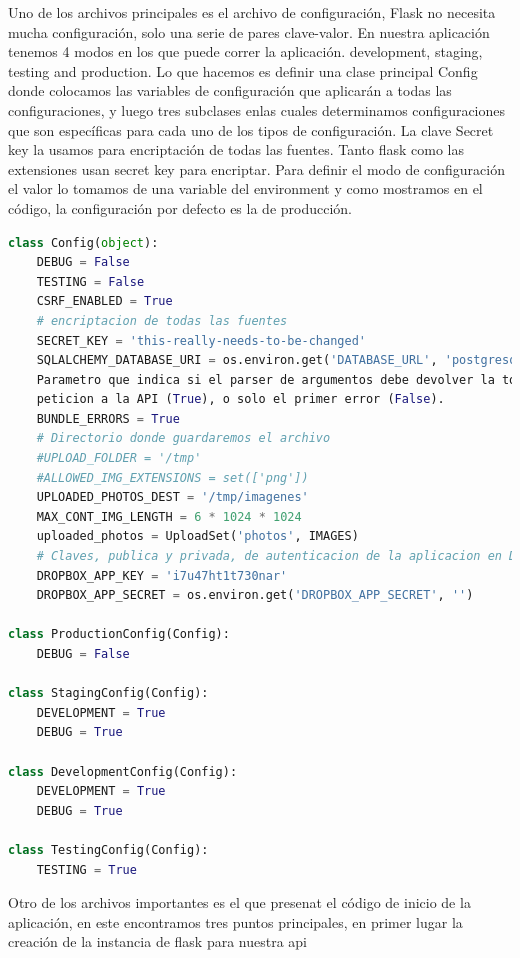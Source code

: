 \documentclass[a4paper,12pt]{article}
\begin{document}
\begin{itemize}
Uno de los archivos principales es el archivo de configuración, Flask no necesita mucha configuración, solo una serie de pares clave-valor. En nuestra aplicación tenemos 4 modos en los que puede correr la aplicación. development, staging, testing and production.
	Lo que hacemos es definir una clase principal Config donde colocamos las variables de configuración que aplicarán a todas las configuraciones, y luego tres subclases enlas cuales determinamos configuraciones que son específicas para cada uno de los tipos de configuración. La clave Secret key la usamos para encriptación de todas las fuentes. Tanto flask como las extensiones usan secret key para encriptar.
	Para definir el modo de configuración el valor lo tomamos de una variable del environment y como mostramos en el código, la configuración por defecto es la de producción.
    
\begin{lstlisting}[language=Python]
class Config(object):
    DEBUG = False
    TESTING = False
    CSRF_ENABLED = True
    # encriptacion de todas las fuentes
    SECRET_KEY = 'this-really-needs-to-be-changed'
    SQLALCHEMY_DATABASE_URI = os.environ.get('DATABASE_URL', 'postgresql:///salud_dev?client_encoding=utf8')
    Parametro que indica si el parser de argumentos debe devolver la totalidad de los errores encontrados en una
    peticion a la API (True), o solo el primer error (False).
    BUNDLE_ERRORS = True
    # Directorio donde guardaremos el archivo
    #UPLOAD_FOLDER = '/tmp'
    #ALLOWED_IMG_EXTENSIONS = set(['png'])
    UPLOADED_PHOTOS_DEST = '/tmp/imagenes'
    MAX_CONT_IMG_LENGTH = 6 * 1024 * 1024
    uploaded_photos = UploadSet('photos', IMAGES)
    # Claves, publica y privada, de autenticacion de la aplicacion en Dropbox.
    DROPBOX_APP_KEY = 'i7u47ht1t730nar'
    DROPBOX_APP_SECRET = os.environ.get('DROPBOX_APP_SECRET', '')

class ProductionConfig(Config):
    DEBUG = False

class StagingConfig(Config):
    DEVELOPMENT = True
    DEBUG = True
    
class DevelopmentConfig(Config):
    DEVELOPMENT = True
    DEBUG = True
    
class TestingConfig(Config):
    TESTING = True
\end{lstlisting}

Otro de los archivos importantes es el que presenat el código de inicio de la aplicación, en este encontramos tres puntos principales, en primer lugar la creación de la instancia de flask para nuestra api


\end{itemize}
\end{document}
